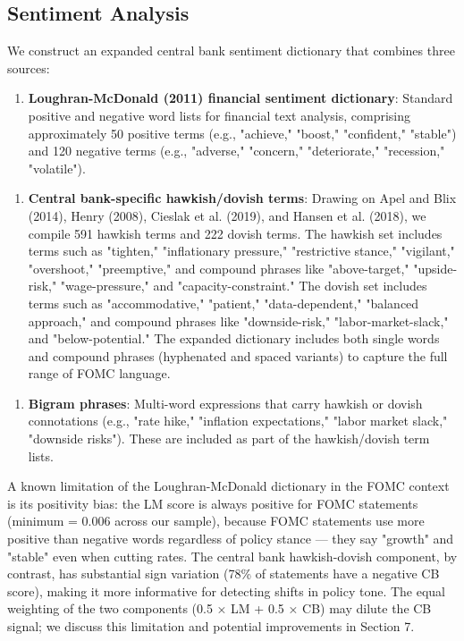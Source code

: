 \documentclass[12pt]{article}
\begin{document}
\subsection{Sentiment Analysis}

We construct an expanded central bank sentiment dictionary that combines three sources:

\begin{enumerate}
\item \textbf{Loughran-McDonald (2011) financial sentiment dictionary}: Standard positive and negative word lists for financial text analysis, comprising approximately 50 positive terms (e.g., "achieve," "boost," "confident," "stable") and 120 negative terms (e.g., "adverse," "concern," "deteriorate," "recession," "volatile").
\end{enumerate}

\begin{enumerate}
\item \textbf{Central bank-specific hawkish/dovish terms}: Drawing on Apel and Blix (2014), Henry (2008), Cieslak et al. (2019), and Hansen et al. (2018), we compile 591 hawkish terms and 222 dovish terms. The hawkish set includes terms such as "tighten," "inflationary pressure," "restrictive stance," "vigilant," "overshoot," "preemptive," and compound phrases like "above-target," "upside-risk," "wage-pressure," and "capacity-constraint." The dovish set includes terms such as "accommodative," "patient," "data-dependent," "balanced approach," and compound phrases like "downside-risk," "labor-market-slack," and "below-potential." The expanded dictionary includes both single words and compound phrases (hyphenated and spaced variants) to capture the full range of FOMC language.
\end{enumerate}

\begin{enumerate}
\item \textbf{Bigram phrases}: Multi-word expressions that carry hawkish or dovish connotations (e.g., "rate hike," "inflation expectations," "labor market slack," "downside risks"). These are included as part of the hawkish/dovish term lists.
\end{enumerate}

A known limitation of the Loughran-McDonald dictionary in the FOMC context is its positivity bias: the LM score is always positive for FOMC statements (minimum = 0.006 across our sample), because FOMC statements use more positive than negative words regardless of policy stance --- they say "growth" and "stable" even when cutting rates. The central bank hawkish-dovish component, by contrast, has substantial sign variation (78\% of statements have a negative CB score), making it more informative for detecting shifts in policy tone. The equal weighting of the two components (0.5 × LM + 0.5 × CB) may dilute the CB signal; we discuss this limitation and potential improvements in Section 7.
\end{document}
